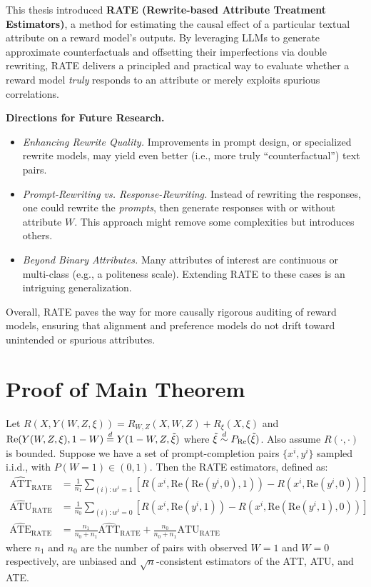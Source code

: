 This thesis introduced \textbf{RATE (Rewrite-based Attribute Treatment Estimators)}, a method for estimating the causal effect of a particular textual attribute on a reward model’s outputs. By leveraging LLMs to generate approximate counterfactuals and offsetting their imperfections via double rewriting, RATE delivers a principled and practical way to evaluate whether a reward model \emph{truly} responds to an attribute or merely exploits spurious correlations.

\textbf{Directions for Future Research.}
\begin{itemize}
    \item \emph{Enhancing Rewrite Quality.} Improvements in prompt design, or specialized rewrite models, may yield even better (i.e., more truly ``counterfactual'') text pairs.
    \item \emph{Prompt-Rewriting vs. Response-Rewriting.} Instead of rewriting the responses, one could rewrite the \emph{prompts}, then generate responses with or without attribute $W$. This approach might remove some complexities but introduces others.
    \item \emph{Beyond Binary Attributes.} Many attributes of interest are continuous or multi-class (e.g., a politeness scale). Extending RATE to these cases is an intriguing generalization.
\end{itemize}

Overall, RATE paves the way for more causally rigorous auditing of reward models, ensuring that alignment and preference models do not drift toward unintended or spurious attributes.

\newpage
\appendix
\section{Proof of Main Theorem}
\label{sec:proofs}
\begin{theorem}
\label{thm:unbiased_rate_consistent}
Let $R(X, Y(W,Z,\xi)) = R_{W, Z}(X, W, Z) + R_{\xi}(X, \xi)$ and $\text{Re}(Y(W, Z, \xi), 1 - W) \stackrel{d}{=} Y(1 - W, Z, \tilde{\xi})$ where $\tilde{\xi} \stackrel{d}{\sim} P_\text{Re}(\tilde{\xi})$. Also assume $R(\cdot, \cdot)$ is bounded. Suppose we have a set of prompt-completion pairs $\{x^i, y^{i}\}$ sampled i.i.d., with $P(W=1) \in (0, 1)$.
Then the RATE estimators, defined as:
\begin{align*}
\widehat{\text{ATT}}_{\text{RATE}} &= \frac{1}{n_1} \sum_{(i): w^{i} = 1} [R(x^i, \text{Re}(\text{Re}(y^{i}, 0), 1)) - R(x^i, \text{Re}(y^{i}, 0))] \\
\widehat{\text{ATU}}_{\text{RATE}} &= \frac{1}{n_0} \sum_{(i): w^{i} = 0} [R(x^i, \text{Re}(y^{i}, 1)) - R(x^i, \text{Re}(\text{Re}(y^{i}, 1), 0))] \\
\widehat{\text{ATE}}_{\text{RATE}} &= \frac{n_1}{n_0 + n_1} \widehat{\text{ATT}}_{\text{RATE}} + \frac{n_0}{n_0 + n_1} \widehat{\text{ATU}}_{\text{RATE}}
\end{align*}
where $n_1$ and $n_0$ are the number of pairs with observed $W = 1$ and $W = 0$ respectively, are unbiased and $\sqrt{n}$-consistent estimators of the ATT, ATU, and ATE.
\end{theorem}

